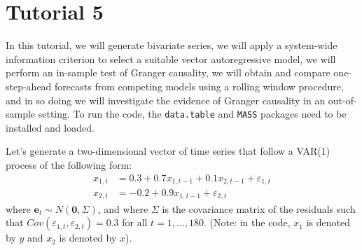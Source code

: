 \documentclass[
  oneside]{book}
\begin{document}
\hypertarget{tutorial-5}{%
\chapter*{Tutorial 5}\label{tutorial-5}}

In this tutorial, we will generate bivariate series, we will apply a system-wide information criterion to select a suitable vector autoregressive model, we will perform an in-sample test of Granger causality, we will obtain and compare one-step-ahead forecasts from competing models using a rolling window procedure, and in so doing we will investigate the evidence of Granger causality in an out-of-sample setting. To run the code, the \texttt{data.table} and \texttt{MASS} packages need to be installed and loaded.

Let's generate a two-dimensional vector of time series that follow a VAR(1) process of the following form: \[\begin{aligned}
x_{1,t} &= 0.3 + 0.7x_{1,t-1} + 0.1x_{2,t-1} + \varepsilon_{1,t} \\
x_{2,t} &= -0.2 + 0.9x_{1,t-1} + \varepsilon_{2,t}
\end{aligned}\] where \(\mathbf{e}_{t} \sim N(\mathbf{0},\Sigma)\), and where \(\Sigma\) is the covariance matrix of the residuals such that \(Cov(\varepsilon_{1,t},\varepsilon_{2,t}) = 0.3\) for all \(t=1,\ldots,180\). (Note: in the code, \(x_1\) is denoted by \(y\) and \(x_2\) is denoted by \(x\)).
\end{document}
